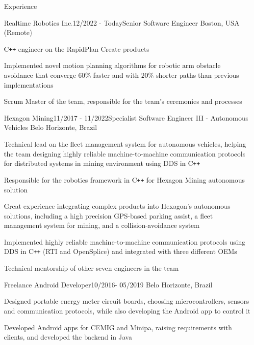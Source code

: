 \documentclass[12pt, a4paper]{resume} %
\begin{document}
\begin{rSection}{Experience}

	\begin{rSubsection}{Realtime Robotics Inc.}{12/2022 - Today}{\normalfont Senior Software Engineer}{ \normalfont Boston, USA (Remote)}
		\item C\texttt{++} engineer on the RapidPlan Create products
		\item Implemented novel motion planning algorithms for robotic arm obstacle avoidance that converge 60\% faster and with 20\% shorter paths than previous implementations
		\item Scrum Master of the team, responsible for the team's ceremonies and processes
	\end{rSubsection}

	\begin{rSubsection}{Hexagon Mining}{11/2017 - 11/2022}{\normalfont Specialist Software Engineer III - Autonomous Vehicles}{ \normalfont Belo Horizonte, Brazil}
		\item Technical lead on the fleet management system for autonomous vehicles, helping the team designing highly reliable machine-to-machine communication protocols for distributed systems in mining environment using DDS in C\texttt{++}
		\item Responsible for the robotics framework in C\texttt{++} for Hexagon Mining autonomous solution
		\item Great experience integrating complex products into Hexagon's autonomous solutions, including a high precision GPS-based parking assist, a fleet management system for mining, and a collision-avoidance system
		\item Implemented highly reliable machine-to-machine communication protocols using DDS in C\texttt{++} (RTI and OpenSplice) and integrated with three different OEMs
		\item Technical mentorship of other seven engineers in the team

	\end{rSubsection}

	\begin{rSubsection}{Freelance Android Developer}{10/2016- 05/2019}{\normalfont}{ \normalfont Belo Horizonte, Brazil}
		\item Designed portable energy meter circuit boards, choosing microcontrollers, sensors and communication protocols, while also developing the Android app to control it
		\item Developed Android apps for CEMIG and Minipa, raising requirements with clients, and developed the backend in Java
	\end{rSubsection}


\end{rSection}
\end{document}
